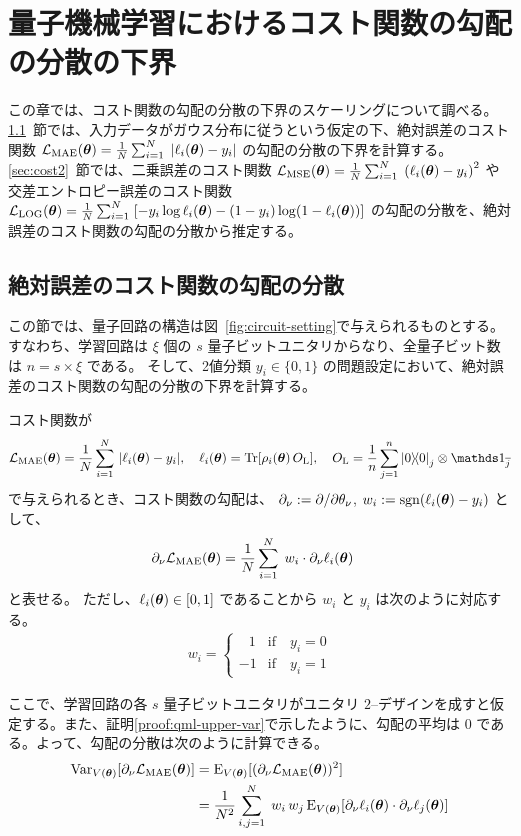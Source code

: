 \chapter{量子機械学習におけるコスト関数の勾配の分散の下界}\label{chap:lower-bound}
この章では、コスト関数の勾配の分散の下界のスケーリングについて調べる。
\ref{sec:cost1}~節では、入力データがガウス分布に従うという仮定の下、絶対誤差のコスト関数 $\mathcal{L}_{\mathrm{MAE}}(\boldsymbol{\theta}) = \frac1N\sum_{i=1}^N \;|\ell_i(\boldsymbol{\theta}) - y_i|$ の勾配の分散の下界を計算する。
\ref{sec:cost2}~節では、二乗誤差のコスト関数 $\mathcal{L}_{\mathrm{MSE}}(\boldsymbol{\theta}) = \frac1N\sum_{i=1}^N \;\qty(\ell_i(\boldsymbol{\theta}) - y_i)^2$ や交差エントロピー誤差のコスト関数 $\mathcal{L}_{\mathrm{LOG}}(\boldsymbol{\theta}) = \frac1N\sum_{i=1}^N \;[-y_i\log\ell_i(\boldsymbol{\theta}) - (1-y_i)\log(1-\ell_i(\boldsymbol{\theta}))]$ の勾配の分散を、絶対誤差のコスト関数の勾配の分散から推定する。

\section{絶対誤差のコスト関数の勾配の分散}\label{sec:cost1}
この節では、量子回路の構造は図~\ref{fig:circuit-setting}で与えられるものとする。すなわち、学習回路は $\xi$ 個の $s$ 量子ビットユニタリからなり、全量子ビット数は $n=s\times\xi$ である。
そして、2値分類 $y_i \in \{0,1\}$ の問題設定において、絶対誤差のコスト関数の勾配の分散の下界を計算する。

コスト関数が 
$$
    \calL_{\mathrm{MAE}}(\bs{\th}) = \frac1N\sum_{i=1}^N \,|\ell_i(\bs{\th}) - y_i|,\quad \ell_i(\bs{\th}) = \Tr[\rho_i(\bs{\th})\,O_\rmL],\quad O_\rmL = \frac{1}{n} \sum_{j=1}^{n}\dyad{0}_{j} \otimes \bbid_{\bar{j}}
$$
で与えられるとき、コスト関数の勾配は、 $\partial_\nu := \partial/\partial\theta_\nu$, $w_i := \operatorname{sgn}(\ell_i(\boldsymbol{\theta}) - y_i)$ として、
\begin{align}
    \partial_\nu\mathcal{L}_{\mathrm{MAE}}(\boldsymbol{\theta})
    &= \frac1N\sum_{i=1}^N \;w_i \cdot \partial_\nu\ell_i(\boldsymbol{\theta})
\end{align}
と表せる。
ただし、$\ell_i(\boldsymbol{\theta}) \in [0,1]$ であることから $w_i$ と $y_i$ は次のように対応する。
\begin{align}
    w_i =
    \begin{cases}
        \;\;\,1 & \text{if}\quad y_i = 0\\
             -1 & \text{if}\quad y_i = 1
    \end{cases}
\end{align}

ここで、学習回路の各 $s$ 量子ビットユニタリがユニタリ $2$--デザインを成すと仮定する。また、証明\ref{proof:qml-upper-var}で示したように、勾配の平均は $0$ である。よって、勾配の分散は次のように計算できる。
\begin{align}
    \operatorname{Var}_{V(\boldsymbol{\theta})}[\partial_\nu\mathcal{L}_{\mathrm{MAE}}(\boldsymbol{\theta})]
    &= \operatorname{E}_{V(\boldsymbol{\theta})}[(\partial_\nu\mathcal{L}_{\mathrm{MAE}}(\boldsymbol{\theta}))^2]\nonumber\\
    &= \frac{1}{N^2}\sum_{i,j=1}^N\;
    w_i\, w_j
    \operatorname{E}_{V(\boldsymbol{\theta})}[\partial_\nu\ell_i(\boldsymbol{\theta})\cdot\partial_\nu\ell_j(\boldsymbol{\theta})]\label{eq:abs-cost-variance}
\end{align}

